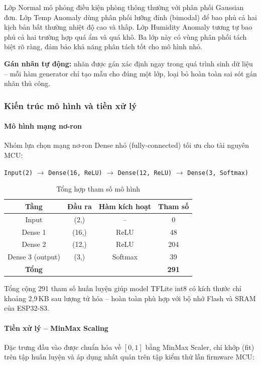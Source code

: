 Lớp Normal mô phỏng điều kiện phòng thông thường với phân phối Gaussian đơn. Lớp Temp Anomaly dùng phân phối lưỡng đỉnh (bimodal) để bao phủ cả hai kịch bản bất thường nhiệt độ cao và thấp. Lớp Humidity Anomaly tương tự bao phủ cả hai trường hợp quá ẩm và quá khô. Ba lớp này có vùng phân phối tách biệt rõ ràng, đảm bảo khả năng phân tách tốt cho mô hình nhỏ.

\textbf{Gán nhãn tự động:} nhãn được gán xác định ngay trong quá trình sinh dữ liệu -- mỗi hàm generator chỉ tạo mẫu cho đúng một lớp, loại bỏ hoàn toàn sai sót gán nhãn thủ công.

\subsubsection*{Kiến trúc mô hình và tiền xử lý}

\paragraph{Mô hình mạng nơ-ron}
Nhóm lựa chọn mạng nơ-ron Dense nhỏ (fully-connected) tối ưu cho tài nguyên MCU:

\begin{center}
\texttt{Input(2)} $\rightarrow$ \texttt{Dense(16, ReLU)} $\rightarrow$ \texttt{Dense(12, ReLU)} $\rightarrow$ \texttt{Dense(3, Softmax)}
\end{center}

\begin{table}[h!]
\centering
\caption{Tổng hợp tham số mô hình}
\label{tab:task5-model}
\begin{tabular}{|c|c|c|c|}
\hline
\textbf{Tầng} & \textbf{Đầu ra} & \textbf{Hàm kích hoạt} & \textbf{Tham số} \\
\hline
Input & (2,) & -- & 0 \\
Dense 1 & (16,) & ReLU & 48 \\
Dense 2 & (12,) & ReLU & 204 \\
Dense 3 (output) & (3,) & Softmax & 39 \\
\hline
\textbf{Tổng} & & & \textbf{291} \\
\hline
\end{tabular}
\end{table}

Tổng cộng 291 tham số huấn luyện giúp model TFLite int8 có kích thước chỉ khoảng 2,9\,KB sau lượng tử hóa -- hoàn toàn phù hợp với bộ nhớ Flash và SRAM của ESP32-S3.

\paragraph{Tiền xử lý -- MinMax Scaling}
Đặc trưng đầu vào được chuẩn hóa về $[0, 1]$ bằng MinMax Scaler, chỉ khớp (fit) trên tập huấn luyện và áp dụng nhất quán trên tập kiểm thử lẫn firmware MCU:

